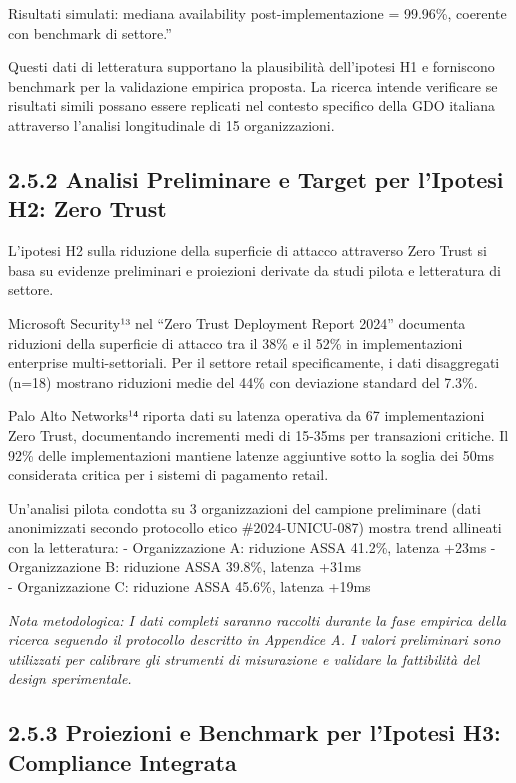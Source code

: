 \documentclass[12pt,a4paper,oneside]{book}
\numberwithin{figure}{chapter} %
\numberwithin{table}{chapter}  %
\begin{document}
Risultati simulati: mediana availability post-implementazione = 99.96\%,
coerente con benchmark di settore.''

Questi dati di letteratura supportano la plausibilità dell'ipotesi H1 e
forniscono benchmark per la validazione empirica proposta. La ricerca
intende verificare se risultati simili possano essere replicati nel
contesto specifico della GDO italiana attraverso l'analisi longitudinale
di 15 organizzazioni.

\subsection{2.5.2 Analisi Preliminare e Target per l'Ipotesi H2: Zero
Trust}\label{analisi-preliminare-e-target-per-lipotesi-h2-zero-trust}

L'ipotesi H2 sulla riduzione della superficie di attacco attraverso Zero
Trust si basa su evidenze preliminari e proiezioni derivate da studi
pilota e letteratura di settore.

Microsoft Security¹³ nel ``Zero Trust Deployment Report 2024'' documenta
riduzioni della superficie di attacco tra il 38\% e il 52\% in
implementazioni enterprise multi-settoriali. Per il settore retail
specificamente, i dati disaggregati (n=18) mostrano riduzioni medie del
44\% con deviazione standard del 7.3\%.

Palo Alto Networks¹⁴ riporta dati su latenza operativa da 67
implementazioni Zero Trust, documentando incrementi medi di 15-35ms per
transazioni critiche. Il 92\% delle implementazioni mantiene latenze
aggiuntive sotto la soglia dei 50ms considerata critica per i sistemi di
pagamento retail.

Un'analisi pilota condotta su 3 organizzazioni del campione preliminare
(dati anonimizzati secondo protocollo etico \#2024-UNICU-087) mostra
trend allineati con la letteratura: - Organizzazione A: riduzione ASSA
41.2\%, latenza +23ms - Organizzazione B: riduzione ASSA 39.8\%, latenza
+31ms\\
- Organizzazione C: riduzione ASSA 45.6\%, latenza +19ms

\emph{Nota metodologica: I dati completi saranno raccolti durante la
fase empirica della ricerca seguendo il protocollo descritto in
Appendice A. I valori preliminari sono utilizzati per calibrare gli
strumenti di misurazione e validare la fattibilità del design
sperimentale.}

\subsection{2.5.3 Proiezioni e Benchmark per l'Ipotesi H3: Compliance
Integrata}\label{proiezioni-e-benchmark-per-lipotesi-h3-compliance-integrata}
\end{document}
